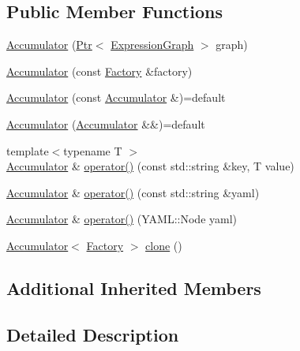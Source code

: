 \subsection*{Public Member Functions}
\begin{DoxyCompactItemize}
\item 
\hyperlink{classmarian_1_1Accumulator_adaea1333c529910642e9d2152d6b0252}{Accumulator} (\hyperlink{namespacemarian_ad1a373be43a00ef9ce35666145137b08}{Ptr}$<$ \hyperlink{classmarian_1_1ExpressionGraph}{Expression\+Graph} $>$ graph)
\item 
\hyperlink{classmarian_1_1Accumulator_a345fa63687817aa7c1bb04d4fb9674f5}{Accumulator} (const \hyperlink{classmarian_1_1Factory}{Factory} \&factory)
\item 
\hyperlink{classmarian_1_1Accumulator_a128ddface8764c47e00df51000cf3b97}{Accumulator} (const \hyperlink{classmarian_1_1Accumulator}{Accumulator} \&)=default
\item 
\hyperlink{classmarian_1_1Accumulator_a3177fd1f47daac50ff52f589fde27736}{Accumulator} (\hyperlink{classmarian_1_1Accumulator}{Accumulator} \&\&)=default
\item 
{\footnotesize template$<$typename T $>$ }\\\hyperlink{classmarian_1_1Accumulator}{Accumulator} \& \hyperlink{classmarian_1_1Accumulator_a4b8b5ce9f86b9eb95bab24f9d3280082}{operator()} (const std\+::string \&key, T value)
\item 
\hyperlink{classmarian_1_1Accumulator}{Accumulator} \& \hyperlink{classmarian_1_1Accumulator_a4a2a61b1d4c808e171f388f5500c3fdb}{operator()} (const std\+::string \&yaml)
\item 
\hyperlink{classmarian_1_1Accumulator}{Accumulator} \& \hyperlink{classmarian_1_1Accumulator_a1e484c1642629556356cd7d50a4c34db}{operator()} (Y\+A\+M\+L\+::\+Node yaml)
\item 
\hyperlink{classmarian_1_1Accumulator}{Accumulator}$<$ \hyperlink{classmarian_1_1Factory}{Factory} $>$ \hyperlink{classmarian_1_1Accumulator_a0e5b3dc96102bd31d11cd0158f6f9189}{clone} ()
\end{DoxyCompactItemize}
\subsection*{Additional Inherited Members}


\subsection{Detailed Description}
